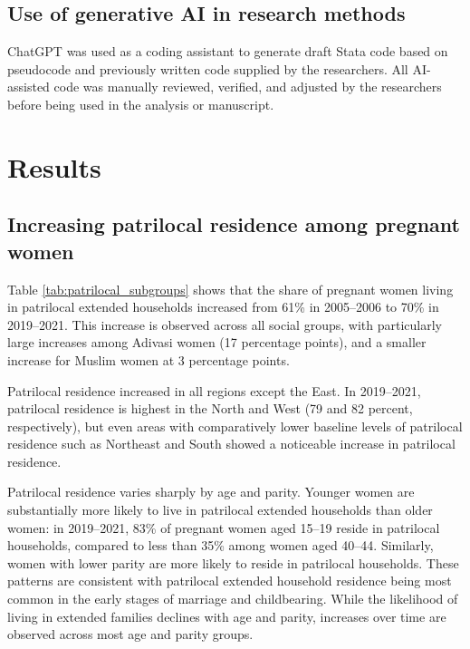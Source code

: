 \documentclass[10pt,twoside,reqno]{article}
\begin{document}
\subsection*{Use of generative AI in research methods}
ChatGPT was used as a coding assistant to generate draft Stata code based on pseudocode and previously written code supplied by the researchers. All AI-assisted code was manually reviewed, verified, and adjusted by the researchers before being used in the analysis or manuscript.


\section*{Results}
\subsection*{Increasing patrilocal residence among pregnant women}

Table \ref{tab:patrilocal_subgroups} shows that the share of pregnant women living in patrilocal extended households increased from 61\% in 2005–2006 to 70\% in 2019–2021. This increase is observed across all social groups, with particularly large increases among Adivasi women (17 percentage points), and a smaller increase for Muslim women at 3 percentage points.

Patrilocal residence increased in all regions except the East. In 2019--2021, patrilocal residence is highest in the North and West (79 and 82 percent, respectively), but even areas with comparatively lower baseline levels of patrilocal residence such as Northeast and South showed a noticeable increase in patrilocal residence.  

Patrilocal residence varies sharply by age and parity. Younger women are substantially more likely to live in patrilocal extended households than older women: in 2019–2021, 83\% of pregnant women aged 15–19 reside in patrilocal households, compared to less than 35\% among women aged 40–44. Similarly, women with lower parity are more likely to reside in patrilocal households. These patterns are consistent with patrilocal extended household residence being most common in the early stages of marriage and childbearing. While the likelihood of living in extended families declines with age and parity, increases over time are observed across most age and parity groups. 
\end{document}
